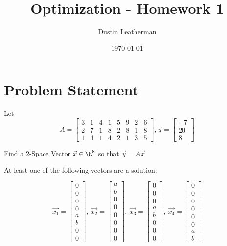 \documentclass[11pt]{article}
\author{Dustin Leatherman}
\date{\today}
\title{Optimization - Homework 1}
\begin{document}
\maketitle
\tableofcontents


\section{Problem Statement}
\label{sec:orgb484466}

Let
$$
A = \begin{bmatrix} 3 & 1 & 4 & 1 & 5 & 9 & 2 & 6\\ 2 & 7 & 1 & 8 & 2 & 8 &
1 & 8\\ 1 & 4 & 1 & 4 & 2 & 1 & 3 & 5 \end{bmatrix} , \vec{y} = \begin{bmatrix}
-7\\ 20\\ 8
\end{bmatrix}
$$


Find a 2-Space Vector \(\vec{x} \in \R^8\) so that \(\vec{y} = A \vec x\)

At least one of the following vectors are a solution:

$$
\vec{x_1} = \begin{bmatrix}
0\\ 0\\ 0\\ 0\\ a\\ b\\ 0\\ 0
\end{bmatrix}, \ \vec{x_2} = \begin{bmatrix}
a\\ b\\ 0\\ 0\\ 0\\ 0\\ 0\\ 0
\end{bmatrix}, \ \vec{x_3} = \begin{bmatrix}
0\\ 0\\ 0\\ a\\ b\\ 0\\ 0\\ 0
\end{bmatrix}, \ \vec{x_4} = \begin{bmatrix}
0\\ 0\\ 0\\ 0\\ 0\\ 0\\ a\\ b
\end{bmatrix}
$$
\end{document}
